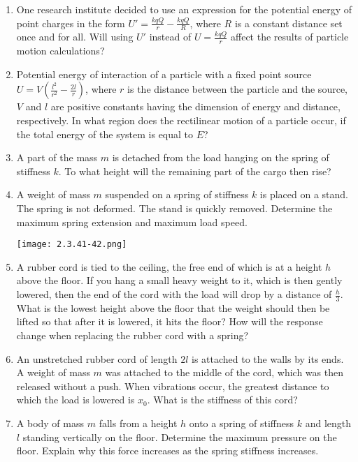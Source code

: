 \documentclass{article}
\begin{document}
\begin{enumerate}[label=2.3.\arabic*]
\item  One research institute decided to use an expression for the potential energy of point charges in the form $U' = \frac{kqQ}{r} - \frac{kqQ}{R}$, where $R$ is a constant distance set once and for all. Will using $U'$ instead of $U = \frac{kqQ}{r}$ affect the results of particle motion calculations?

\item  Potential energy of interaction of a particle with a fixed point source $U = V (\frac{l^2}{r^2} - \frac{2l}{r})$, where $r$ is the distance between the particle and the source, $V$ and $l$ are positive constants having the dimension of energy and distance, respectively. In what region does the rectilinear motion of a particle occur, if the total energy of the system is equal to $E$?

\item  A part of the mass $m$ is detached from the load hanging on the spring of stiffness $k$. To what height will the remaining part of the cargo then rise?

\item A weight of mass $m$ suspended on a spring of stiffness $k$ is placed on a stand. The spring is not deformed. The stand is quickly removed. Determine the maximum spring extension and maximum load speed.

\begin{center}
    \texttt{[image: 2.3.41-42.png]}
\end{center}


\item  A rubber cord is tied to the ceiling, the free end of which is at a height $h$ above the floor. If you hang a small heavy weight to it, which is then gently lowered, then the end of the cord with the load will drop by a distance of $\frac{h}{3}$. What is the lowest height above the floor that the weight should then be lifted so that after it is lowered, it hits the floor? How will the response change when replacing the rubber cord with a spring?

\item  An unstretched rubber cord of length $2l$ is attached to the walls by its ends. A weight of mass $m$ was attached to the middle of the cord, which was then released without a push. When vibrations occur, the greatest distance to which the load is lowered is $x_0$. What is the stiffness of this cord?

\item  A body of mass $m$ falls from a height $h$ onto a spring of stiffness $k$ and length $l$ standing vertically on the floor. Determine the maximum pressure on the floor. Explain why this force increases as the spring stiffness increases.


\end{enumerate}
\end{document}
